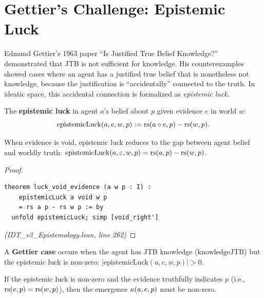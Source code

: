 \section{Gettier's Challenge: Epistemic Luck}

Edmund Gettier's 1963 paper ``Is Justified True Belief Knowledge?'' demonstrated
that JTB is not sufficient for knowledge. His counterexamples showed cases where
an agent has a justified true belief that is nonetheless not knowledge, because
the justification is ``accidentally'' connected to the truth. In ideatic space,
this accidental connection is formalized as \emph{epistemic luck}.

\begin{definition}
\label{def:epistemic-luck}
The \textbf{epistemic luck} in agent $a$'s belief about $p$ given evidence $e$
in world $w$:
\[
  \mathrm{epistemicLuck}(a, e, w, p) := \mathrm{rs}(a \circ e, p) - \mathrm{rs}(w, p).
\]
\end{definition}

\begin{theorem}
\label{thm:luck-void-evidence}
When evidence is void, epistemic luck reduces to the gap between agent belief
and worldly truth:
$\mathrm{epistemicLuck}(a, \varepsilon, w, p) = \mathrm{rs}(a, p) - \mathrm{rs}(w, p)$.
\end{theorem}

\begin{proof}
\begin{lstlisting}
theorem luck_void_evidence (a w p : I) :
    epistemicLuck a void w p
    = rs a p - rs w p := by
  unfold epistemicLuck; simp [void_right']
\end{lstlisting}
\textit{(IDT\_v3\_Epistemology.lean, line 262)}
\end{proof}

\begin{definition}
\label{def:gettier-case}
A \textbf{Gettier case} occurs when the agent has JTB knowledge
($\mathrm{knowledgeJTB}$) but the epistemic luck is non-zero:
$|\mathrm{epistemicLuck}(a, e, w, p)| > 0$.
\end{definition}

\begin{theorem}
\label{thm:gettier-emergence}
If the epistemic luck is non-zero and the evidence truthfully indicates $p$
(i.e., $\mathrm{rs}(e, p) = \mathrm{rs}(w, p)$), then the emergence $\kappa(a, e, p)$
must be non-zero.
\end{theorem}

